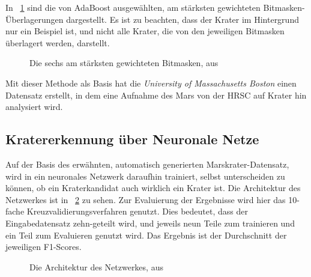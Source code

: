 In \figurename~\ref{fig:BDS12_02} sind die von AdaBoost ausgewählten, am stärksten gewichteten Bitmasken-Überlagerungen dargestellt. Es ist zu beachten, dass der Krater im Hintergrund nur ein Beispiel ist, und nicht alle Krater, die von den jeweiligen Bitmasken überlagert werden, darstellt.

\begin{figure}[H]
	\caption{Die sechs am stärksten gewichteten Bitmasken, aus \cite{bandeira}}
	\label{fig:BDS12_02}
\end{figure}

Mit dieser Methode als Basis hat die \textit{University of Massachusetts Boston} einen Datensatz\cite{umass} erstellt, in dem eine Aufnahme des Mars von der HRSC\cite{neukum2004hrsc} auf Krater hin analysiert wird.


\subsection{Kratererkennung über Neuronale Netze}
\label{ssec:crater_cnn}
Auf der Basis des erwähnten, automatisch generierten Marskrater-Datensatz, wird in \cite{crater_cnn} ein neuronales Netzwerk daraufhin trainiert, selbst unterscheiden zu können, ob ein Kraterkandidat auch wirklich ein Krater ist. Die Architektur des Netzwerkes ist in \figurename~\ref{fig:CLLD16_01} zu sehen. Zur Evaluierung der Ergebnisse wird hier das 10-fache Kreuzvalidierungsverfahren genutzt. Dies bedeutet, dass der Eingabedatensatz zehn-geteilt wird, und jeweils neun Teile zum trainieren und ein Teil zum Evaluieren genutzt wird. Das Ergebnis ist der Durchschnitt der jeweiligen F1-Scores.%

\begin{figure}[H]
	\caption{Die Architektur des Netzwerkes, aus \cite{crater_cnn}}
	\label{fig:CLLD16_01}
\end{figure}

